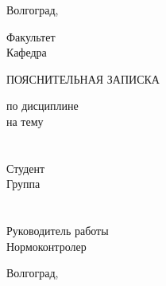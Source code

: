 {{\begin{center}
Волгоград,~\the\year
\end{center}
\newpage
\thispagestyle{empty}
\setcounter{page}{1}
\begin{center}
\VSTUTitleHeading
\end{center}
Факультет~\uline{\VSTUFaculty\hfill}\\
Кафедра~\uline{\VSTUDepartment\hfill}\\
\vspace{2cm}
\begin{center}
ПОЯСНИТЕЛЬНАЯ ЗАПИСКА\\
\end{center}
по дисциплине \uline{\VSTUSubject\hfill}\\
на тему \VSTUTitleUL\uline{\hfill}\\
\\
\\
Студент \\
Группа \uline{\VSTUStudentGroup}\\
\\
\\
Руководитель работы 
\hfill
{}\\
Нормоконтролер 
\hfill
{}\\
\vspace{\fill}
\begin{center}
Волгоград,~\the\year
\end{center}
}
}
